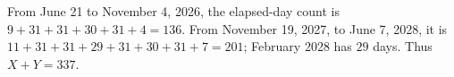 From June 21 to November 4, 2026, the elapsed-day count is $9+31+31+30+31+4=136$. From November 19, 2027, to June 7, 2028, it is $11+31+31+29+31+30+31+7=201$; February 2028 has $29$ days. Thus $\boxed{X+Y=337}$.
